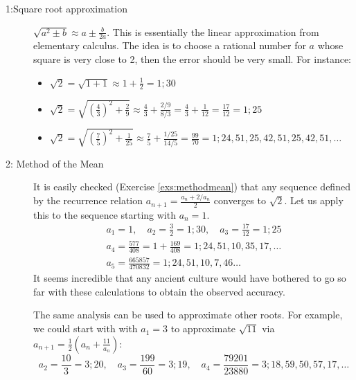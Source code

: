 \begin{description}\label{babroot}
	\item[1:\lstsp Square root approximation] $\sqrt{a^2\pm b}\approx a\pm\frac b{2a}$. This is essentially the linear approximation from elementary calculus. The idea is to choose a rational number for $a$ whose square is very close to 2, then the error should be very small. For instance:
	\begin{itemize}
  	\item $\sqrt 2=\sqrt{1+1}\approx 1+\frac 12=1;30$
  	\item $\sqrt 2=\sqrt{\left(\frac 43\right)^2+\frac 29}\approx\frac 43+\frac{2/9}{8/3}=\frac 43+\frac 1{12}=\frac{17}{12}=1;25$
  	\item $\sqrt 2=\sqrt{\left(\frac 75\right)^2+\frac 1{25}}\approx \frac 75+\frac{1/25}{14/5}=\frac{99}{70}=1;24,51,25,42,51,25,42,51,\ldots$
	\end{itemize}
	
	\item[2: Method of the Mean]\label{methodmean} It is easily checked (Exercise \ref{exs:methodmean}) that any sequence defined by the recurrence relation $a_{n+1}=\frac{a_n+2/a_n}2$ converges to $\sqrt 2$. Let us apply this to the sequence starting with $a_n=1$.
	\begin{gather*}
		a_1=1,\quad a_2=\frac 32=1;30,\quad a_3=\frac{17}{12}=1;25\\
		a_4=\frac{577}{408}=1+\frac{169}{408}=1;24,51,10,35,17,\ldots\\
		a_5=\frac{665857}{470832}=1;24,51,10,7,46\ldots
	\end{gather*}
	It seems incredible that any ancient culture would have bothered to go so far with these calculations to obtain the observed accuracy.\smallbreak

	The same analysis can be used to approximate other roots. For example, we could start with with $a_1=3$ to approximate $\sqrt{11}$ via $a_{n+1}=\frac 12(a_n+\frac{11}{a_n})$:
	\[
		a_2=\frac{10}3=3;20,\quad a_3=\frac{199}{60}=3;19,\quad a_4=\frac{79201}{23880}=3;18,59,50,57,17,\ldots
	\]
\end{description}





